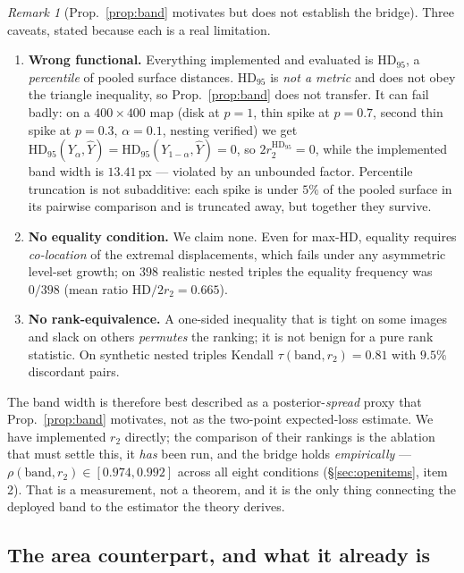 \documentclass[11pt]{article}
\theoremstyle{remark}
\newtheorem{remark}{Remark}
\newcommand{\Yhat}{\widehat{Y}}
\newcommand{\Ylo}{Y_{\alpha}}
\newcommand{\Yhi}{Y_{1-\alpha}}
\newcommand{\HD}{\mathrm{HD}}
\newcommand{\HDF}{\mathrm{HD}_{95}}
\begin{document}
\begin{remark}[Prop.~\ref{prop:band} motivates but does not establish the bridge]\label{rem:nobridge}
Three caveats, stated because each is a real limitation.
\begin{enumerate}
\item \textbf{Wrong functional.} Everything implemented and evaluated is $\HDF$, a
\emph{percentile} of pooled surface distances. $\HDF$ is \emph{not a metric} and
does not obey the triangle inequality, so Prop.~\ref{prop:band} does not transfer.
It can fail badly: on a $400\times400$ map (disk at $p=1$, thin spike at $p=0.7$,
second thin spike at $p=0.3$, $\alpha=0.1$, nesting verified) we get
$\HDF(\Ylo,\Yhat)=\HDF(\Yhi,\Yhat)=0$, so $2r_2^{\HDF}=0$, while the implemented
band width is $13.41$\,px --- violated by an unbounded factor. Percentile
truncation is not subadditive: each spike is under $5\%$ of the pooled surface in
its pairwise comparison and is truncated away, but together they survive.
\item \textbf{No equality condition.} We claim none. Even for max-$\HD$, equality
requires \emph{co-location} of the extremal displacements, which fails under any
asymmetric level-set growth; on $398$ realistic nested triples the equality
frequency was $0/398$ (mean ratio $\HD/2r_2 = 0.665$).
\item \textbf{No rank-equivalence.} A one-sided inequality that is tight on some
images and slack on others \emph{permutes} the ranking; it is not benign for a pure
rank statistic. On synthetic nested triples Kendall $\tau(\text{band}, r_2)=0.81$
with $9.5\%$ discordant pairs.
\end{enumerate}
The band width is therefore best described as a posterior-\emph{spread} proxy that
Prop.~\ref{prop:band} motivates, not as the two-point expected-loss estimate. We
have implemented $r_2$ directly; the comparison of their rankings is the ablation that
must settle this, it \emph{has} been run, and the bridge holds \emph{empirically} ---
$\rho(\text{band}, r_2)\in[0.974, 0.992]$ across all eight conditions
(\S\ref{sec:openitems}, item 2). That is a measurement, not a theorem, and it is the
only thing connecting the deployed band to the estimator the theory derives.
\end{remark}

\subsection{The area counterpart, and what it already is}\label{sec:area}
\end{document}
